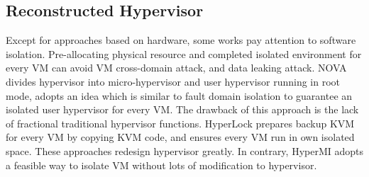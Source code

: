 \documentclass[conference]{IEEEtran}
\begin{document}
\subsection{Reconstructed Hypervisor }
Except for approaches based on hardware, some works\cite{nexen,Steinberg2010NOVA,hyperlock} pay attention to software isolation. Pre-allocating physical resource and completed isolated environment for every VM can avoid VM cross-domain attack, and data leaking attack. NOVA\cite{Steinberg2010NOVA} divides hypervisor into micro-hypervisor and user hypervisor running in root mode, adopts an idea which is similar to fault domain isolation to guarantee an isolated user hypervisor for every VM. The drawback of this approach is the lack of fractional traditional hypervisor functions. HyperLock \cite{hyperlock} prepares backup KVM for every VM by copying KVM code, and ensures every VM run in own isolated space. 
These approaches redesign hypervisor greatly. In contrary, HyperMI adopts a feasible way to isolate VM without lots of modification to hypervisor. 
\end{document}
